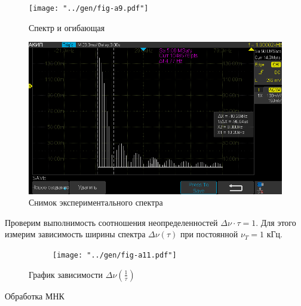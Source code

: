 \begin{figure}[H]
\begin{minipage}[H]{.5\textwidth}
		\vspace*{-15pt}
		\centering
		\texttt{[image: "../gen/fig-a9.pdf"]}
		\caption{Спектр и огибающая}
		\label{fig:harmonics}
\end{minipage}%
\begin{minipage}[H]{.5\textwidth}
		\centering
		\includegraphics[width=1.0\linewidth]{"../photos/impulse5"}
		\caption{Снимок экспериментального спектра}
		\label{photo:harmonics}
\end{minipage}
\end{figure}

Проверим выполнимость соотношения неопределенностей $\Delta \nu \cdot \tau = 1$. Для этого измерим зависимость ширины спектра $\Delta \nu(\tau)$ при постоянной $\nu_T = 1$ кГц.

\begin{figure}
\begin{minipage}[H]{.5\textwidth}
	\begin{figure}[H]
		\centering
		\texttt{[image: "../gen/fig-a11.pdf"]}
		\label{fig:a11}
	\end{figure}
\end{minipage}%
\begin{minipage}[H]{.5\textwidth}
	\begin{table}[H]
		\centering
		
	\end{table}
\end{minipage}
\vspace*{-20pt}
\caption{График зависимости $\Delta\nu(\frac{1}{\tau})$ }
\label{tab:a11}
\end{figure}

\begin{table}[H]
	\centering
	
	\caption{Обработка МНК}
	\label{tab:a11-mnk}
\end{table}



